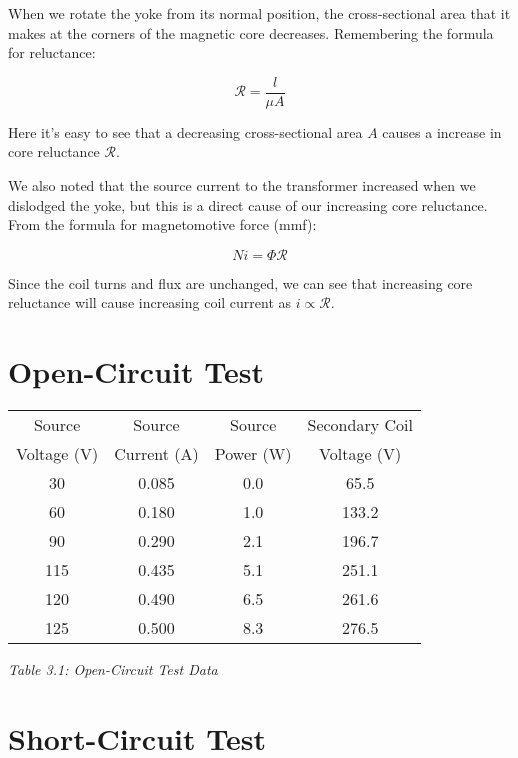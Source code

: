 \documentclass{IEEEtran}
\begin{document}
When we rotate the yoke from its normal position, the cross-sectional area that it makes at the corners of the magnetic core decreases. Remembering the formula for reluctance:

\begin{equation}
    \mathcal{R} = \frac{l}{\mu A}
    \label{eq:reluctance}
\end{equation}

Here it's easy to see that a decreasing cross-sectional area \(A\) causes a increase in core reluctance \(\mathcal{R}\).

We also noted that the source current to the transformer increased when we dislodged the yoke, but this is a direct cause of our increasing core reluctance. From the formula for magnetomotive force (mmf):

\begin{equation}
    Ni = \Phi \mathcal{R}
    \label{eq:mmf}
\end{equation}

Since the coil turns and flux are unchanged, we can see that increasing core reluctance will cause increasing coil current as \(i \propto \mathcal{R}\).

\section{Open-Circuit Test}

\begin{center}
\begin{tabular}{ |c|c|c|c| }
    \hline
    Source & Source & Source & Secondary Coil \\
    Voltage (V) & Current (A) & Power (W) & Voltage (V) \\
    \hline
    30 & 0.085 & 0.0 & 65.5 \\
    \hline
    60 & 0.180 & 1.0 & 133.2 \\
    \hline
    90 & 0.290 & 2.1 & 196.7 \\
    \hline
    115 & 0.435 & 5.1 & 251.1 \\
    \hline
    120 & 0.490 & 6.5 & 261.6 \\
    \hline
    125 & 0.500 & 8.3 & 276.5 \\
    \hline
\end{tabular}
\end{center}
\begin{center}
\emph{Table 3.1: Open-Circuit Test Data}
\end{center}



\section{Short-Circuit Test}



\end{document}
